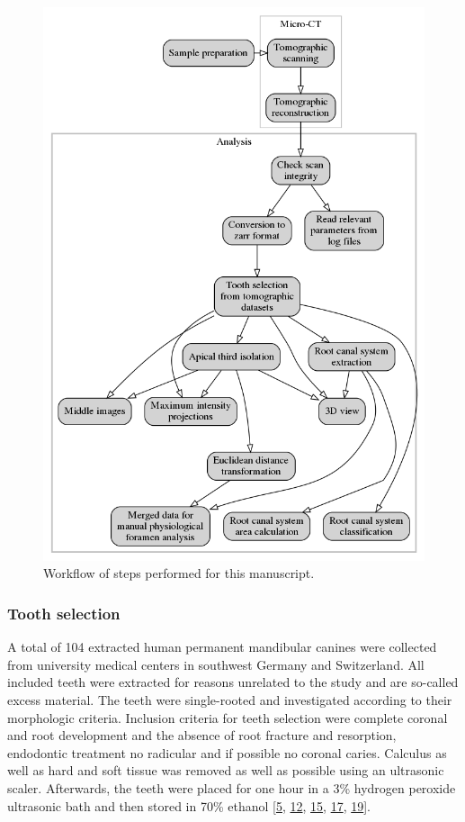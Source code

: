 \documentclass[
  american,
]{article}
\begin{document}
\begin{figure}
\hypertarget{fig:workflow}{%
\centering
\includegraphics{images/workflow.png}
\caption{Workflow of steps performed for this manuscript.}\label{fig:workflow}
}
\end{figure}

\hypertarget{tooth-selection}{%
\subsubsection{Tooth selection}\label{tooth-selection}}

A total of 104 extracted human permanent mandibular canines were collected from university medical centers in southwest Germany and Switzerland.
All included teeth were extracted for reasons unrelated to the study and are so-called excess material.
The teeth were single-rooted and investigated according to their morphologic criteria.
Inclusion criteria for teeth selection were complete coronal and root development and the absence of root fracture and resorption, endodontic treatment no radicular and if possible no coronal caries.
Calculus as well as hard and soft tissue was removed as well as possible using an ultrasonic scaler.
Afterwards, the teeth were placed for one hour in a 3\% hydrogen peroxide ultrasonic bath and then stored in 70\% ethanol {[}\protect\hyperlink{ref-1HkTk4VKM}{5}, \protect\hyperlink{ref-OttTicsv}{12}, \protect\hyperlink{ref-amSKhLb1}{15}, \protect\hyperlink{ref-ZTgDEakx}{17}, \protect\hyperlink{ref-1Gn1pVZXt}{19}{]}.
\end{document}

